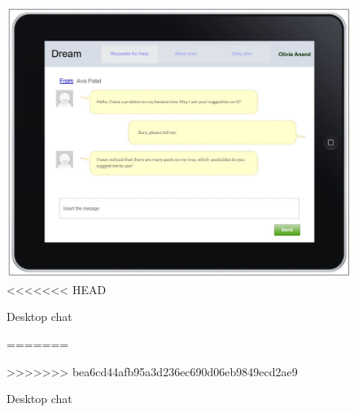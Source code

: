 \begin{figure}[H]
	\centering
    \includegraphics[page=1, width=\textwidth]{Images/desktop_chat.JPG}
<<<<<<< HEAD
	\caption{\label{fig:FE_image4}Desktop chat}
=======
	\caption{\label{fig:FE_image}Desktop chat}
>>>>>>> bea6cd44afb95a3d236ec690d06eb9849ecd2ae9
\end{figure}